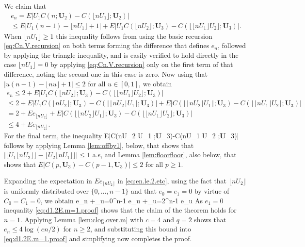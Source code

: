 \documentclass[12pt]{article}
\begin{document}
We claim that
\begin{multline*}
e_n = E|U_1C(n;\textbf{U}_2)- C(\lfloor nU_1 \rfloor;\textbf{U}_2)|\\
\le  E|U_1(n-1)-
\lfloor nU_1 \rfloor+1|+ E|U_1C(\lfloor n U_2 \rfloor;\textbf{U}_3)-C(\lfloor \lfloor nU_1 \rfloor U_2 \rfloor;\textbf{U}_3)|.
\end{multline*}
When $\lfloor nU_1 \rfloor \ge 1$ this inequality follows from using the basic recursion \eqref{eq:Cn.V.recursion} on both terms forming the difference that defines $e_n$, followed by applying the triangle inequality, and is easily verified to hold directly in the case $\lfloor nU_1 \rfloor =0$ by applying \eqref{eq:Cn.V.recursion} only on the first term of that difference, noting the second one in this case is zero. Now using that $|u(n-1)-\lfloor nu \rfloor + 1| \le 2$ for all $u \in [0,1]$,  we obtain
\begin{multline} \label{eq:en.le.2.etc}
e_n \le 2 + E|U_1C(\lfloor nU_2 \rfloor;\textbf{U}_3)-  C(\lfloor \lfloor nU_1 \rfloor U_2\rfloor;\textbf{U}_3)|\\
\le 2+ E|U_1C(\lfloor nU_2 \rfloor;\textbf{U}_3)-  C(\lfloor \lfloor nU_2 \rfloor U_1 \rfloor;\textbf{U}_3)|+E|C(\lfloor \lfloor nU_2 \rfloor U_1 \rfloor;\textbf{U}_3)-C(\lfloor \lfloor nU_1 \rfloor U_2 \rfloor;\textbf{U}_3)|\\
= 2+ Ee_{\lfloor n U_2\rfloor}+E|C(\lfloor \lfloor nU_2 \rfloor U_1 \rfloor;\textbf{U}_3)-C(\lfloor\lfloor nU_1 \rfloor  U_2 \rfloor;\textbf{U}_3)|\\
\le 4 + Ee_{\lfloor n U_2\rfloor}.
\end{multline}
For the final term, the inequality
\beas
E|C(\lfloor \lfloor nU_2 \rfloor U_1 \rfloor;\textbf{U}_3)-C(\lfloor\lfloor nU_1 \rfloor  U_2 \rfloor;\textbf{U}_3)|  
\enas  
follows by applying Lemma \ref{lem:offby1}, below, that shows that $| \lfloor U_1 \lfloor n U_2 \rfloor \rfloor - \lfloor U_2 \lfloor nU_1 \rfloor \rfloor | \le 1$ a.s, and Lemma \ref{lem:floorfloor}, also below, that shows that $E|C(p,\textbf{U}_3)-C(p-1,\textbf{U}_3)| \le 2$ for all $p \ge 1$. 


Expanding the expectation in $Ee_{\lfloor n U_2 \rfloor}$ in \eqref{eq:en.le.2.etc}, using the fact that $\lfloor nU_2 \rfloor$ is uniformly distributed over $\{0,\ldots,n-1\}$ and that $e_0=e_1=0$ by virtue of $C_0=C_1=0$, we obtain
\beas %
e_n +\sum_{u=0}^{n-1} e_u +\sum_{u=2}^{n-1} e_u
\enas
As $e_1=0$ inequality \eqref{eq:d1.2E.m=1.proof} shows that the claim of the theorem holds for $n=1$. Applying Lemma \ref{lem:clog.over.m} with $c=4$ and $q=2$ shows that $e_n \le 4 \log (en/2)$ for $n \ge 2$, and substituting this bound into 
\eqref{eq:d1.2E.m=1.proof} and simplifying now completes the proof. \bbox
\end{document}
